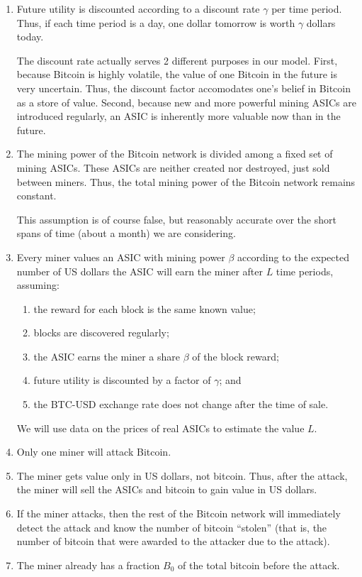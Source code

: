 \documentclass[12pt]{article}
\newcommand*{\ABtcOrig}{{B_0}}
\begin{document}
\begin{enumerate}
  \item
    Future utility is discounted according to a discount rate $\gamma$ per time period.
    Thus, if each time period is a day, one dollar tomorrow is worth $\gamma$ dollars
    today.

    The discount rate actually serves 2 different purposes in our model.
    First, because Bitcoin is highly volatile, the value of one Bitcoin in the future is very uncertain. Thus, the discount factor accomodates one's belief in Bitcoin as a store of value.
    Second, because new and more powerful mining ASICs are introduced regularly, an ASIC is inherently more valuable now than in the future.
  \item
    The mining power of the Bitcoin network is divided among a fixed set of mining
    ASICs. These ASICs are neither created nor destroyed, just sold between miners.
    Thus, the total mining power of the Bitcoin network remains constant.

    This assumption is of course false, but reasonably accurate over the short spans of time (about a month) we are considering.
  \item
    Every miner values an ASIC with mining power $\beta$ according to the
    expected number of US dollars the ASIC will earn the miner after $L$ time periods,
    assuming:
    \begin{enumerate}
      \item
        the reward for each block is the same known value;
      \item
        blocks are discovered regularly;
      \item
        the ASIC earns the miner a share $\beta$ of the block reward;
      \item
        future utility is discounted by a factor of $\gamma$; and
      \item
        the BTC-USD exchange rate does not change after the time of sale.
    \end{enumerate}

    We will use data on the prices of real ASICs to estimate the value $L$.
  \item
    Only one miner will attack Bitcoin.
  \item
    The miner gets value only in US dollars, not bitcoin. Thus, after the attack, the
    miner will sell the ASICs and bitcoin to gain value in US dollars.
  \item
    If the miner attacks, then the rest of the Bitcoin network will
    immediately detect the attack and know the number of bitcoin ``stolen''
    (that is, the number of bitcoin that were awarded to the attacker due to the attack).
  \item
    The miner already has a fraction $\ABtcOrig$ of the total bitcoin
    before the attack.


\end{enumerate}
\end{document}
